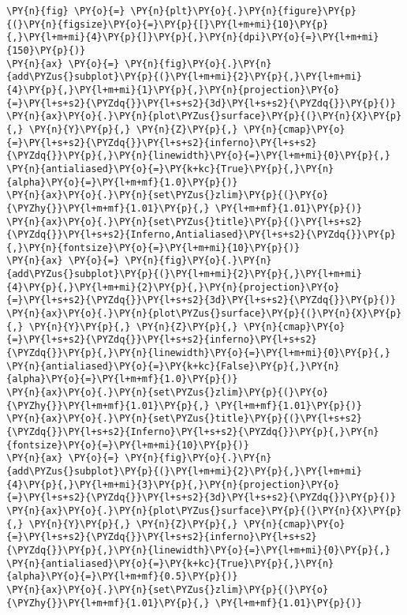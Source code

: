 \begin{tcolorbox}[breakable, size=fbox, boxrule=1pt, pad at break*=1mm,colback=cellbackground, colframe=cellborder]
\begin{Verbatim}[commandchars=\\\{\}]
\PY{n}{fig} \PY{o}{=} \PY{n}{plt}\PY{o}{.}\PY{n}{figure}\PY{p}{(}\PY{n}{figsize}\PY{o}{=}\PY{p}{[}\PY{l+m+mi}{10}\PY{p}{,}\PY{l+m+mi}{4}\PY{p}{]}\PY{p}{,}\PY{n}{dpi}\PY{o}{=}\PY{l+m+mi}{150}\PY{p}{)}
\PY{n}{ax} \PY{o}{=} \PY{n}{fig}\PY{o}{.}\PY{n}{add\PYZus{}subplot}\PY{p}{(}\PY{l+m+mi}{2}\PY{p}{,}\PY{l+m+mi}{4}\PY{p}{,}\PY{l+m+mi}{1}\PY{p}{,}\PY{n}{projection}\PY{o}{=}\PY{l+s+s2}{\PYZdq{}}\PY{l+s+s2}{3d}\PY{l+s+s2}{\PYZdq{}}\PY{p}{)}
\PY{n}{ax}\PY{o}{.}\PY{n}{plot\PYZus{}surface}\PY{p}{(}\PY{n}{X}\PY{p}{,} \PY{n}{Y}\PY{p}{,} \PY{n}{Z}\PY{p}{,} \PY{n}{cmap}\PY{o}{=}\PY{l+s+s2}{\PYZdq{}}\PY{l+s+s2}{inferno}\PY{l+s+s2}{\PYZdq{}}\PY{p}{,}\PY{n}{linewidth}\PY{o}{=}\PY{l+m+mi}{0}\PY{p}{,} \PY{n}{antialiased}\PY{o}{=}\PY{k+kc}{True}\PY{p}{,}\PY{n}{alpha}\PY{o}{=}\PY{l+m+mf}{1.0}\PY{p}{)}
\PY{n}{ax}\PY{o}{.}\PY{n}{set\PYZus{}zlim}\PY{p}{(}\PY{o}{\PYZhy{}}\PY{l+m+mf}{1.01}\PY{p}{,} \PY{l+m+mf}{1.01}\PY{p}{)}
\PY{n}{ax}\PY{o}{.}\PY{n}{set\PYZus{}title}\PY{p}{(}\PY{l+s+s2}{\PYZdq{}}\PY{l+s+s2}{Inferno,Antialiased}\PY{l+s+s2}{\PYZdq{}}\PY{p}{,}\PY{n}{fontsize}\PY{o}{=}\PY{l+m+mi}{10}\PY{p}{)}
\PY{n}{ax} \PY{o}{=} \PY{n}{fig}\PY{o}{.}\PY{n}{add\PYZus{}subplot}\PY{p}{(}\PY{l+m+mi}{2}\PY{p}{,}\PY{l+m+mi}{4}\PY{p}{,}\PY{l+m+mi}{2}\PY{p}{,}\PY{n}{projection}\PY{o}{=}\PY{l+s+s2}{\PYZdq{}}\PY{l+s+s2}{3d}\PY{l+s+s2}{\PYZdq{}}\PY{p}{)}
\PY{n}{ax}\PY{o}{.}\PY{n}{plot\PYZus{}surface}\PY{p}{(}\PY{n}{X}\PY{p}{,} \PY{n}{Y}\PY{p}{,} \PY{n}{Z}\PY{p}{,} \PY{n}{cmap}\PY{o}{=}\PY{l+s+s2}{\PYZdq{}}\PY{l+s+s2}{inferno}\PY{l+s+s2}{\PYZdq{}}\PY{p}{,}\PY{n}{linewidth}\PY{o}{=}\PY{l+m+mi}{0}\PY{p}{,} \PY{n}{antialiased}\PY{o}{=}\PY{k+kc}{False}\PY{p}{,}\PY{n}{alpha}\PY{o}{=}\PY{l+m+mf}{1.0}\PY{p}{)}
\PY{n}{ax}\PY{o}{.}\PY{n}{set\PYZus{}zlim}\PY{p}{(}\PY{o}{\PYZhy{}}\PY{l+m+mf}{1.01}\PY{p}{,} \PY{l+m+mf}{1.01}\PY{p}{)}
\PY{n}{ax}\PY{o}{.}\PY{n}{set\PYZus{}title}\PY{p}{(}\PY{l+s+s2}{\PYZdq{}}\PY{l+s+s2}{Inferno}\PY{l+s+s2}{\PYZdq{}}\PY{p}{,}\PY{n}{fontsize}\PY{o}{=}\PY{l+m+mi}{10}\PY{p}{)}
\PY{n}{ax} \PY{o}{=} \PY{n}{fig}\PY{o}{.}\PY{n}{add\PYZus{}subplot}\PY{p}{(}\PY{l+m+mi}{2}\PY{p}{,}\PY{l+m+mi}{4}\PY{p}{,}\PY{l+m+mi}{3}\PY{p}{,}\PY{n}{projection}\PY{o}{=}\PY{l+s+s2}{\PYZdq{}}\PY{l+s+s2}{3d}\PY{l+s+s2}{\PYZdq{}}\PY{p}{)}
\PY{n}{ax}\PY{o}{.}\PY{n}{plot\PYZus{}surface}\PY{p}{(}\PY{n}{X}\PY{p}{,} \PY{n}{Y}\PY{p}{,} \PY{n}{Z}\PY{p}{,} \PY{n}{cmap}\PY{o}{=}\PY{l+s+s2}{\PYZdq{}}\PY{l+s+s2}{inferno}\PY{l+s+s2}{\PYZdq{}}\PY{p}{,}\PY{n}{linewidth}\PY{o}{=}\PY{l+m+mi}{0}\PY{p}{,} \PY{n}{antialiased}\PY{o}{=}\PY{k+kc}{True}\PY{p}{,}\PY{n}{alpha}\PY{o}{=}\PY{l+m+mf}{0.5}\PY{p}{)}
\PY{n}{ax}\PY{o}{.}\PY{n}{set\PYZus{}zlim}\PY{p}{(}\PY{o}{\PYZhy{}}\PY{l+m+mf}{1.01}\PY{p}{,} \PY{l+m+mf}{1.01}\PY{p}{)}

\end{Verbatim}
\end{tcolorbox}
